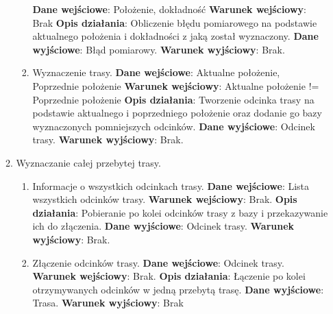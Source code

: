 \documentclass[11pt]{article}
\begin{document}
\begin{enumerate}
\begin{enumerate}[label*=\arabic*.]
\begin{enumerate}[label*=\arabic*.]
				\textbf{Dane wejściowe}: Położenie, dokładność	\newline
				\textbf{Warunek wejściowy}: Brak		\newline   	
				\textbf{Opis działania}: Obliczenie błędu pomiarowego na podstawie aktualnego położenia i dokładności z jaką został wyznaczony.	\newline
				\textbf{Dane wyjściowe}: Błąd pomiarowy.	\newline
				\textbf{Warunek wyjściowy}: Brak.
				\item Wyznaczenie trasy. \newline
				\textbf{Dane wejściowe}: Aktualne położenie, Poprzednie położenie	\newline
				\textbf{Warunek wejściowy}: Aktualne położenie != Poprzednie położenie		\newline   	
				\textbf{Opis działania}: Tworzenie odcinka trasy na podstawie aktualnego i poprzedniego położenie oraz dodanie go bazy wyznaczonych pomniejszych odcinków.	\newline
				\textbf{Dane wyjściowe}: Odcinek trasy.	\newline
				\textbf{Warunek wyjściowy}: Brak.
			\end{enumerate}
			\item Wyznaczanie całej przebytej trasy.
			\begin{enumerate}[label*=\arabic*.]
				\item Informacje o wszystkich odcinkach trasy. \newline
				\textbf{Dane wejściowe}: Lista wszystkich odcinków trasy.	\newline
				\textbf{Warunek wejściowy}: Brak.		\newline   	
				\textbf{Opis działania}: Pobieranie po kolei odcinków trasy z bazy i przekazywanie ich do złączenia.	\newline
				\textbf{Dane wyjściowe}: Odcinek trasy.	\newline
				\textbf{Warunek wyjściowy}: Brak.
				\item Złączenie odcinków trasy. \newline
				\textbf{Dane wejściowe}: Odcinek trasy.	\newline
				\textbf{Warunek wejściowy}: Brak.		\newline   	
				\textbf{Opis działania}: Łączenie po kolei otrzymywanych odcinków w jedną przebytą trasę.	\newline
				\textbf{Dane wyjściowe}: Trasa.	\newline
				\textbf{Warunek wyjściowy}: Brak

\end{enumerate}
\end{enumerate}
\end{enumerate}
\end{document}
